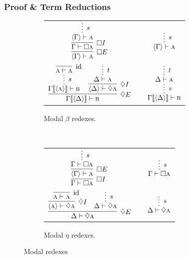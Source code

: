 \subsubsection{Proof \& Term Reductions}
\begin{figure}
	\begin{subfigure}{1\textwidth}
	\centering
		\begin{tabularx}{0.85\textwidth}{@{}ccc@{}}
		$\infer[\Box E]{\bracket{\Gamma} \vdash \prop{a}}{
			\infer[\Box I]{\Gamma \vdash \Box \prop{a}}{
				\infer*[s]{\bracket{\Gamma} \vdash  \prop{a}}{}
			}
		}
		$
		&
		\raisebox{10pt}{$\implies$}
		&
		$\infer*[s]{\bracket{\Gamma} \vdash \prop{a}}{}
		$\\[\smallsep]
		$\infer[\diamond E]{\Gamma\ctx{\bracket{\Delta}} \vdash \prop{b}}{
			\infer*[s]{\Gamma\ctx{\bracket{\prop{a}}} \vdash \prop{b}}{
				\infer[\Ax]{\prop{a} \vdash \prop{a}}{}}
			&
			\infer[\diamond I]{\bracket{\Delta} \vdash \diamond\prop{a}}{
				\infer*[t]{\Delta \vdash \prop{a}}{}
			}
		}
		$
		&
		\raisebox{20pt}{$\implies$}
		&
		$\infer*[s]{\Gamma\ctx{\bracket{\Delta}} \vdash \prop{b}}{
			\infer*[t]{\Delta \vdash \prop{a}}{}
		}
		$
		\end{tabularx}
		\caption{Modal $\beta$ redexes.}
		\label{subfigure:modal_beta_reductions}
	\end{subfigure}\\[\midsep]
	\begin{subfigure}{1\textwidth}
	\centering
		\begin{tabularx}{0.8\textwidth}{@{}ccc@{}}
			$\infer[\Box I]{\Gamma \vdash \Box\prop{a}}{
			\infer[\Box E]{\bracket{\Gamma} \vdash \prop{a}}{
					\infer*[s]{\Gamma \vdash  \Box\prop{a}}{}
				}
			}
			$
			&
			\raisebox{5pt}{$\equiv$}
			&
			$\infer*[s]{\Gamma \vdash \Box\prop{a}}{}
			$\\[\smallsep]
			$\infer[\diamond E]{\Delta \vdash \diamond\prop{a}}{
				\infer[\diamond I]{\bracket{\prop{a}}\vdash \diamond \prop{a}}{
					\infer[\Ax]{\prop{a} \vdash \prop{a}}{}
				}
				&
				\infer*[s]{\Delta \vdash \diamond\prop{a}}{}
			}$
			&
			\raisebox{15pt}{$\equiv$}
			&
			$\infer*[s]{\Delta \vdash \diamond \prop{a}}{}
			$
		\end{tabularx}
	\caption{Modal $\eta$ redexes.}
	\label{subfigure:modal_eta_reductions}
	\end{subfigure}
	\caption{Modal redexes}
	\label{figure:modal_reductions}
\end{figure}

